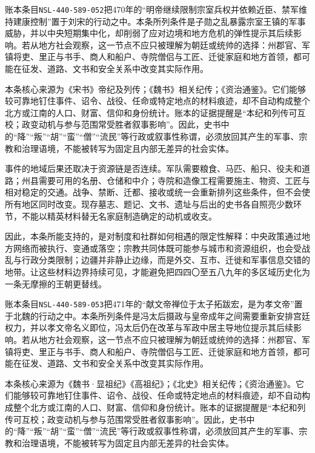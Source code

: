 账本条目\texttt{NSL-440-589-052}把470年的“明帝继续限制宗室兵权并依赖近臣、禁军维持建康控制”置于刘宋的行动之中。本条所列条件是子勋之乱暴露宗室王镇的军事威胁，并以中央短期集中化，却削弱了应对边境和地方危机的弹性提示其后续影响。若从地方社会观察，这一节点不应只被理解为朝廷或统帅的选择：州郡官、军镇将吏、里正与书手、商人和船户、寺院僧侣与工匠、迁徙家庭和地方首领，都可能在征发、道路、文书和安全关系中改变其实际作用。

本条核心来源为《宋书》帝纪及列传；《魏书》相关纪传；《资治通鉴》。它们能够较可靠地钉住事件、诏令、战役、任命或特定地点的材料痕迹，却不自动构成整个北方或江南的人口、财富、信仰和身份统计。账本的证据提醒是“本纪和列传可互校；政变动机与参与范围常受胜者叙事影响”。因此，史书中的“降”“叛”“胡”“蛮”“僧”“流民”等行政或叙事性称谓，必须放回其产生的军事、宗教和治理语境，不能被转写为固定且内部无差异的社会实体。

事件的地域后果还取决于资源链是否连续。军队需要粮食、马匹、船只、役夫和道路；州县需要可用的名册、仓储和中介；寺院和造像工程需要施主、物资、工匠与相对稳定的交通。战争、禁断、迁都、接收或统一会重新排列这些条件，但不会使所有地区同时改变。现存墓志、题记、文书、遗址与后出的史书各自照亮少数环节，不能以精英材料替无名家庭制造确定的动机或收支。

因此，本条所能支持的，是对制度和社群如何相遇的限定性解释：中央政策通过地方网络而被执行、变通或落空；宗教共同体既可能参与城市和资源组织，也会受战乱与行政分类限制；边疆并非静止边缘，而是外交、互市、迁徙和军事信息交错的地带。让这些材料边界持续可见，才能避免把四四〇至五八九年的多区域历史化为一条无摩擦的王朝更替线。

账本条目\texttt{NSL-440-589-053}把471年的“献文帝禅位于太子拓跋宏，是为孝文帝”置于北魏的行动之中。本条所列条件是冯太后摄政与皇帝成年之间需要重新安排宫廷权力，并以孝文帝名义即位，冯太后仍在改革与军政中居主导地位提示其后续影响。若从地方社会观察，这一节点不应只被理解为朝廷或统帅的选择：州郡官、军镇将吏、里正与书手、商人和船户、寺院僧侣与工匠、迁徙家庭和地方首领，都可能在征发、道路、文书和安全关系中改变其实际作用。

本条核心来源为《魏书·显祖纪》《高祖纪》；《北史》相关纪传；《资治通鉴》。它们能够较可靠地钉住事件、诏令、战役、任命或特定地点的材料痕迹，却不自动构成整个北方或江南的人口、财富、信仰和身份统计。账本的证据提醒是“本纪和列传可互校；政变动机与参与范围常受胜者叙事影响”。因此，史书中的“降”“叛”“胡”“蛮”“僧”“流民”等行政或叙事性称谓，必须放回其产生的军事、宗教和治理语境，不能被转写为固定且内部无差异的社会实体。

